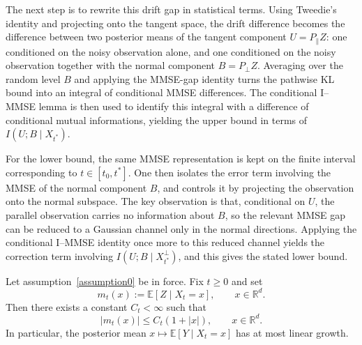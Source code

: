 \documentclass[twoside,11pt]{article}
\numberwithin{equation}{section}
\begin{document}
The next step is to rewrite this drift gap in statistical terms. Using Tweedie’s identity and projecting onto the tangent space, the drift difference becomes the difference between two posterior means of the tangent component \(U=P_\parallel Z\): one conditioned on the noisy observation alone, and one conditioned on the noisy observation together with the normal component \(B=P_\perp Z\). Averaging over the random level \(B\) and applying the MMSE-gap identity turns the pathwise KL bound into an integral of conditional MMSE differences. The conditional I--MMSE lemma is then used to identify this integral with a difference of conditional mutual informations, yielding the upper bound in terms of \(I(U;B\mid X_{t^*})\). 

For the lower bound, the same MMSE representation is kept on the finite interval corresponding to \(t\in[t_0,t^*]\). One then isolates the error term involving the MMSE of the normal component \(B\), and controls it by projecting the observation onto the normal subspace. The key observation is that, conditional on \(U\), the parallel observation carries no information about \(B\), so the relevant MMSE gap can be reduced to a Gaussian channel only in the normal directions. Applying the conditional I--MMSE identity once more to this reduced channel yields the correction term involving \(I(U;B\mid X_{t^*}^\perp)\), and this gives the stated lower bound. 
\begin{lemma}\label{lem:posterior-mean-linear-growth}
Let assumption~\ref{assumption0} be in force. Fix $t\ge 0$ and set
\[
m_t(x):=\mathbb E[Z\mid X_t=x],\qquad x\in\mathbb R^d.
\]
Then there exists a constant $C_t<\infty$ such that
\[
|m_t(x)|\le C_t(1+|x|),\qquad x\in\mathbb R^d.
\]
In particular, the posterior mean $x\mapsto \mathbb E[Y\mid X_t=x]$ has at most linear growth.
\end{lemma}
\end{document}
